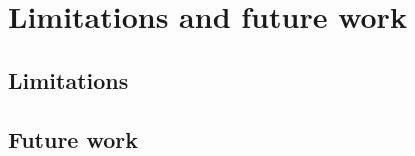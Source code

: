 \documentclass[../report.tex]{subfiles}
\begin{document}
	
	\chapter{Limitations and future work}
	
	\section{Limitations}
	
	\section{Future work}
	
\end{document}
